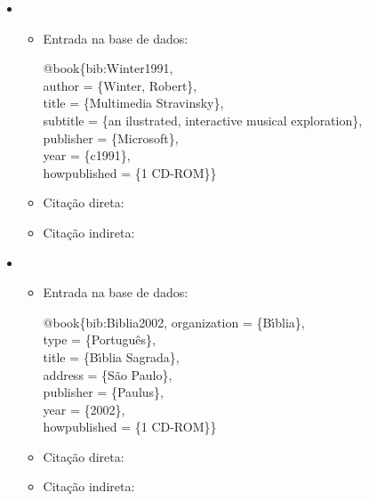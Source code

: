 \documentclass[a4paper,12pt,oneside,onecolumn]{uerj}
\newcommand{\formato}[1]{\begin{flushleft}{#1}\end{flushleft}}
\begin{document}
\begin{itemize}[label={Ex.:},leftmargin=\parindent,parsep=0pt,itemsep=0pt]
  \item \formato{\citetext{bib:Winter1991}}

  \begin{itemize}[leftmargin=*,parsep=0pt,itemsep=0pt]
    \item Entrada na base de dados:

    \formato{
      @book\{bib:Winter1991,\\
        author = \{Winter, Robert\},\\
        title = \{Multimedia Stravinsky\},\\
        subtitle = \{an ilustrated, interactive musical exploration\},\\
        publisher = \{Microsoft\},\\
        year = \{c1991\},\\
        howpublished = \{1 CD-ROM\}\}\\
    }

    \item Citação direta: 
    \item Citação indireta: \cite{bib:Winter1991}\\
  \end{itemize}

  \item \formato{\citetext{bib:Biblia2002}}

  \begin{itemize}[leftmargin=*,parsep=0pt,itemsep=0pt]
    \item Entrada na base de dados:

    \formato{
      @book\{bib:Biblia2002,
        organization = \{B{\' \i}blia\},\\
        type = \{Portugu{\^e}s\},\\
        title = \{B{\' \i}blia Sagrada\},\\
        address = \{S{\~a}o Paulo\},\\
        publisher = \{Paulus\},\\
        year = \{2002\},\\
        howpublished = \{1 CD-ROM\}\}\\
    }

    \item Citação direta: 
    \item Citação indireta: \cite{bib:Biblia2002}
  \end{itemize}
\end{itemize}
\end{document}
